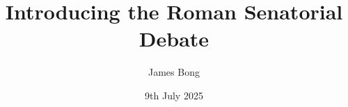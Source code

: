 \documentclass[9pt]{article}
\title{Introducing the Roman Senatorial Debate}
\author{James Bong}
\date{9th July 2025}
\begin{document}
\sloppy


\maketitle









\end{document}
